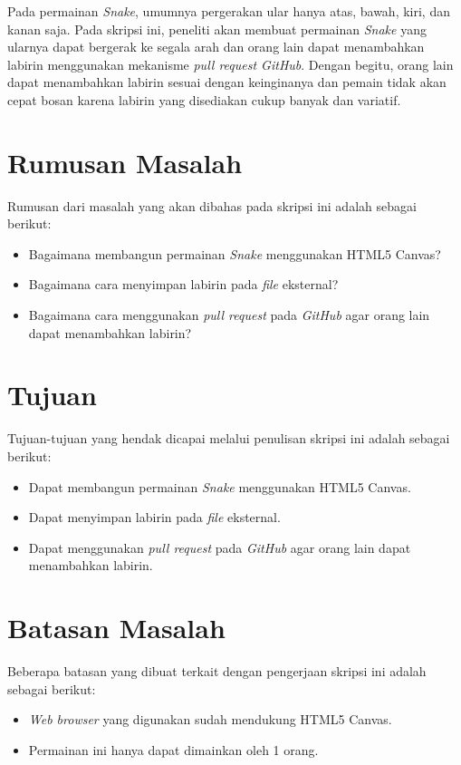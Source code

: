 Pada permainan \textit{Snake}, umumnya pergerakan ular hanya atas, bawah, kiri, dan kanan saja. Pada skripsi ini, peneliti akan membuat permainan \textit{Snake} yang ularnya dapat bergerak ke segala arah dan orang lain dapat menambahkan labirin menggunakan mekanisme \textit{pull request GitHub}. Dengan begitu, orang lain dapat menambahkan labirin sesuai dengan keinginanya dan pemain tidak akan cepat bosan karena labirin yang disediakan cukup banyak dan variatif.

\section{Rumusan Masalah}
\label{sec:rumusan}
Rumusan dari masalah yang akan dibahas pada skripsi ini adalah sebagai berikut:
\begin{itemize}
	\item Bagaimana membangun permainan \textit{Snake} menggunakan HTML5 Canvas?
	\item Bagaimana cara menyimpan labirin pada \textit{file} eksternal?
	\item Bagaimana cara menggunakan \textit{pull request} pada \textit{GitHub} agar orang lain dapat menambahkan labirin?
\end{itemize}


\section{Tujuan}
\label{sec:tujuan}
Tujuan-tujuan yang hendak dicapai melalui penulisan skripsi ini adalah sebagai berikut:
\begin{itemize}
	\item Dapat membangun permainan \textit{Snake} menggunakan HTML5 Canvas.
	\item Dapat menyimpan labirin pada \textit{file} eksternal.
	\item Dapat menggunakan \textit{pull request} pada \textit{GitHub} agar orang lain dapat menambahkan labirin.
\end{itemize}


\section{Batasan Masalah}
\label{sec:batasan}
Beberapa batasan yang dibuat terkait dengan pengerjaan skripsi ini adalah sebagai berikut:
\begin{itemize}
	\item \textit{Web browser} yang digunakan sudah mendukung HTML5 Canvas.
	\item Permainan ini hanya dapat dimainkan oleh 1 orang.
\end{itemize}


